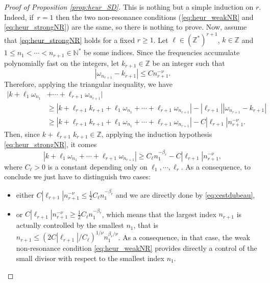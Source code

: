 \documentclass[JEP,XML,SOM,Unicode,NoEqCountersInSection,published]{cedram}
\theoremstyle{definition}
\begin{document}
\begin{proof}[Proof of Proposition \ref{prop:heur_SD}] This is nothing but a simple induction on $r$. Indeed, if~$r=1$ then the two non-resonance conditions (\eqref{eq:heur_weakNR} and \eqref{eq:heur_strongNR}) are the same, so there is nothing to prove. Now, assume that \eqref{eq:heur_strongNR} holds for a fixed $r\geq 1$. Let $\ell \in (\mathbb{Z}^*)^{r+1}$, $k \in \mathbb{Z}$ and $1\leq n_1< \cdots < n_{r+1} \in \mathbb{N}^*$ be some indices. Since the frequencies accumulate polynomially fast on the integers, let $k_{r+1} \in \mathbb{Z}$ be an integer such that
\[
|\omega_{n_{r+1}} - k_{r+1} | \leq C n_{r+1}^{-\nu}.
\]
Therefore, applying the triangular inequality, we have
\begin{equation*}
\begin{split}
|k+\ell_1 \omega_{n_1}& + \cdots + \ell_{r+1} \omega_{n_{r+1}}| \\ &\geq |k+\ell_{r+1} k_{r+1}+\ell_1 \omega_{n_1} + \cdots + \ell_{r+1} \omega_{n_{r+1}}|- |\ell_{r+1}| |\omega_{n_{r+1}} - k_{r+1} | \\
&\geq |k+\ell_{r+1} k_{r+1}+\ell_1 \omega_{n_1} + \cdots + \ell_{r+1} \omega_{n_{r+1}}|- C |\ell_{r+1}| n_{r+1}^{-\nu}.
\end{split}
\end{equation*}
Then, since $k+\ell_{r+1} k_{r+1} \in \mathbb{Z}$, applying the induction hypothesis \eqref{eq:heur_strongNR}, it comes
\begin{equation}
\label{eq:cestdubeau}
|k+\ell_1 \omega_{n_1} + \cdots + \ell_{r+1} \omega_{n_{r+1}}| \geq C_\ell n_1^{-\beta_r} - C | \ell_{r+1}| n_{r+1}^{-\nu},
\end{equation}
where $C_\ell >0$ is a constant depending only on $\ell_1,\cdots,\ell_r$. As a consequence, to conclude we just have to distinguish two cases:
\begin{itemize}
\item either $C | \ell_{r+1}| n_{r+1}^{-\nu} \leq \frac12 C_\ell n_1^{-\beta_r}$ and we are directly done by \eqref{eq:cestdubeau},
\item or $C | \ell_{r+1}| n_{r+1}^{-\nu} \geq \frac12 C_\ell n_1^{-\beta_r}$, which means that the largest index $n_{r+1}$ is actually controlled by the smallest $n_1$, that is $ n_{r+1} \leq (2 C | \ell_{r+1}| / C_\ell)^{1/\nu} n_1^{\beta_r/\nu}$. As a consequence, in that case, the weak non-resonance condition \eqref{eq:heur_weakNR} provides directly a control of the small divisor with respect to the smallest index $n_1$.\qedhere
\end{itemize}
\end{proof}
\end{document}
